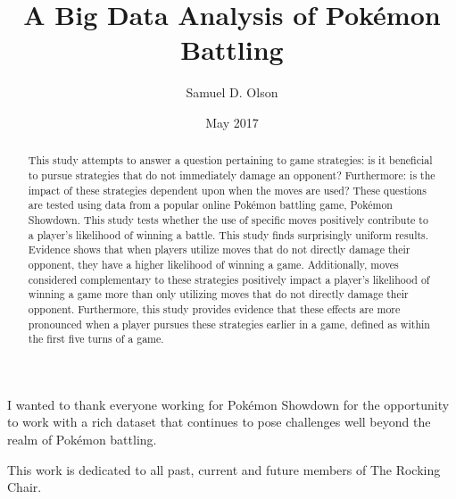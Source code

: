 \documentclass[12pt,twoside]{reedthesis}
\title{A Big Data Analysis of Pokémon Battling}
\author{Samuel D. Olson}
\date{May 2017}
\begin{document}
      \maketitle
  
  \frontmatter %
  \pagestyle{empty} %

      \begin{acknowledgements}
      I wanted to thank everyone working for Pokémon Showdown for the
      opportunity to work with a rich dataset that continues to pose
      challenges well beyond the realm of Pokémon battling.
    \end{acknowledgements}
  
  
      \hypersetup{linkcolor=black}
    \setcounter{tocdepth}{2}
    \tableofcontents
  
      \listoftables
  
      \listoffigures
  
      \begin{abstract}
      \par  
      
      This study attempts to answer a question pertaining to game strategies:
      is it beneficial to pursue strategies that do not immediately damage an
      opponent? Furthermore: is the impact of these strategies dependent upon
      when the moves are used? These questions are tested using data from a
      popular online Pokémon battling game, Pokémon Showdown. This study tests
      whether the use of specific moves positively contribute to a player's
      likelihood of winning a battle. This study finds surprisingly uniform
      results. Evidence shows that when players utilize moves that do not
      directly damage their opponent, they have a higher likelihood of winning
      a game. Additionally, moves considered complementary to these strategies
      positively impact a player's likelihood of winning a game more than only
      utilizing moves that do not directly damage their opponent. Furthermore,
      this study provides evidence that these effects are more pronounced when
      a player pursues these strategies earlier in a game, defined as within
      the first five turns of a game.
    \end{abstract}
  
      \begin{dedication}
      This work is dedicated to all past, current and future members of The
      Rocking Chair.
    \end{dedication}
  
\end{document}
